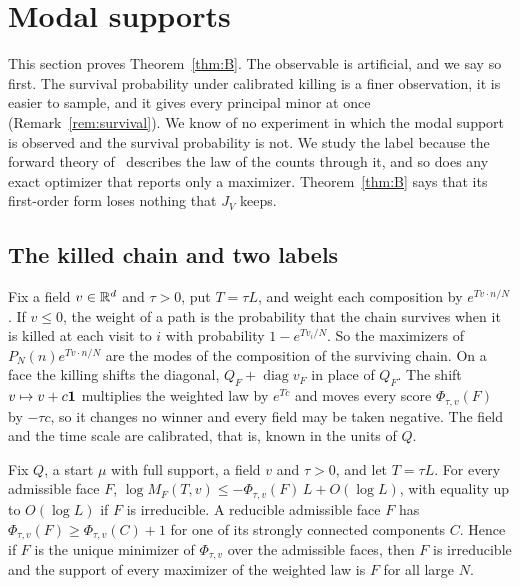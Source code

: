 \section{Modal supports}\label{sec:modal}

This section proves Theorem~\ref{thm:B}. The observable is artificial, and we say so first.
The survival probability under calibrated killing is a finer observation, it is easier to
sample, and it gives every principal minor at once (Remark~\ref{rem:survival}). We know of no
experiment in which the modal support is observed and the survival probability is not. We
study the label because the forward theory of~\cite{paperC1} describes the law of the counts
through it, and so does any exact optimizer that reports only a maximizer. Theorem~\ref{thm:B}
says that its first-order form loses nothing that $J_V$ keeps.

\subsection{The killed chain and two labels}\label{sec:observation}

Fix a field $v\in\mathbb{R}^d$ and $\tau>0$, put $T=\tau L$, and weight each composition by
$e^{Tv\cdot n/N}$. If $v\le0$, the weight of a path is the probability that the chain survives
when it is killed at each visit to $i$ with probability $1-e^{Tv_i/N}$. So the maximizers of
$P_N(n)e^{Tv\cdot n/N}$ are the modes of the composition of the surviving chain. On a face the
killing shifts the diagonal, $Q_F+\operatorname{diag}v_F$ in place of $Q_F$. The shift
$v\mapsto v+c\mathbf{1}$ multiplies the weighted law by $e^{Tc}$ and moves every score
$\Phi_{\tau,v}(F)$ by $-\tau c$, so it changes no winner and every field may be taken negative.
The field and the time scale are calibrated, that is, known in the units of $Q$.

\begin{proposition}\label{prop:controlled-score}
Fix $Q$, a start $\mu$ with full support, a field $v$ and $\tau>0$, and let $T=\tau L$. For every
admissible face $F$, $\log M_F(T,v)\le-\Phi_{\tau,v}(F)\,L+O(\log L)$, with equality up to
$O(\log L)$ if $F$ is irreducible. A reducible admissible face $F$ has
$\Phi_{\tau,v}(F)\ge\Phi_{\tau,v}(C)+1$ for one of its strongly connected components $C$. Hence if
$F$ is the unique minimizer of $\Phi_{\tau,v}$ over the admissible faces, then $F$ is irreducible
and the support of every maximizer of the weighted law is $F$ for all large $N$.
\end{proposition}

